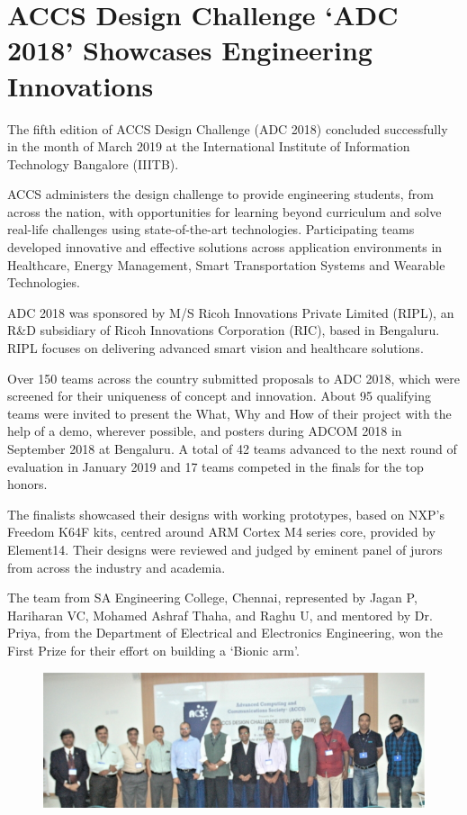 \chapter{ACCS Design Challenge ‘ADC 2018’ Showcases Engineering Innovations}

\begin{multicols}{2}

The fifth edition of ACCS Design Challenge (ADC 2018) concluded successfully in the month of March 2019 at the International Institute of Information Technology Bangalore (IIITB). 

ACCS administers the design challenge to provide engineering students, from across the nation, with opportunities for learning beyond curriculum and solve real-life challenges using state-of-the-art technologies. Participating teams developed innovative and effective solutions across application environments in Healthcare, Energy Management, Smart Transportation Systems and Wearable Technologies.  

ADC 2018 was sponsored by M/S Ricoh Innovations Private Limited (RIPL), an R\&D subsidiary of Ricoh Innovations Corporation (RIC), based in Bengaluru. RIPL focuses on delivering advanced smart vision and healthcare solutions. 

Over 150 teams across the country submitted proposals to ADC 2018, which were screened for their uniqueness of concept and innovation. About 95 qualifying teams were invited to present the What, Why and How of their project with the help of a demo, wherever possible, and posters during ADCOM 2018 in September 2018 at Bengaluru. A total of 42 teams advanced to the next round of evaluation in January 2019 and 17 teams competed in the finals for the top honors. 

The finalists showcased their designs with working prototypes, based on NXP's Freedom K64F kits, centred around ARM Cortex M4 series core, provided by Element14. Their designs were reviewed and judged by eminent panel of jurors from across the industry and academia.

The team from SA Engineering College, Chennai, represented by Jagan P, Hariharan VC, Mohamed Ashraf Thaha, and Raghu U, and mentored by Dr. Priya, from the Department of Electrical and Electronics Engineering, won the First Prize for their effort on building a `Bionic arm'.  

\end{multicols}

\begin{figure}[H]
\centering
\includegraphics[scale=3.28]{src/Figures/adc.jpg}
\end{figure}


